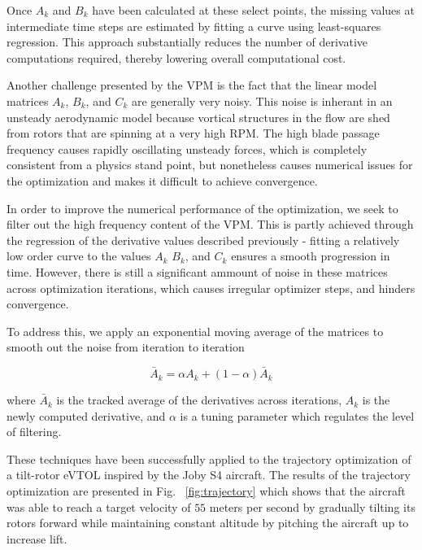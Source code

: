 \documentclass[12pt, letterpaper]{article}
\begin{document}
Once $A_k$ and $B_k$ have been calculated at these select points, the missing values at intermediate time steps are estimated by fitting a curve using least-squares regression.  This approach substantially reduces the number of derivative computations required, thereby lowering overall computational cost. 



Another challenge presented by the VPM is the fact that the linear model matrices $A_k$, $B_k$, and $C_k$ are generally very noisy.  This noise is inherant in an unsteady aerodynamic model because vortical structures in the flow are shed from rotors that are spinning at a very high RPM. The high blade passage frequency causes rapidly oscillating unsteady forces, which is completely consistent from a physics stand point, but nonetheless causes numerical issues for the optimization and makes it difficult to achieve convergence. 

In order to improve the numerical performance of the optimization, we seek to filter out the high frequency content of the VPM.  This is partly achieved through the regression of the derivative values described previously - fitting a relatively low order curve to the values $A_k$ $B_k$, and $C_k$ ensures a smooth progression in time.  However, there is still a significant ammount of noise in these matrices across optimization iterations, which causes irregular optimizer steps, and hinders convergence.

To address this, we apply an exponential moving average of the matrices to smooth out the noise from iteration to iteration

\begin{equation}
\label{eq:EMA}
    \bar{A}_k = \alpha A_k + (1 - \alpha) \bar{A}_k
\end{equation}

where $\bar{A}_k$ is the tracked average of the derivatives across iterations, $A_k$ is the newly computed derivative, and $\alpha$ is a tuning parameter which regulates the level of filtering.

These techniques have been successfully applied to the trajectory optimization of a tilt-rotor eVTOL inspired by the Joby S4 aircraft.  The results of the trajectory optimization are presented in Fig. ~\ref{fig:trajectory} which shows that the aircraft was able to reach a target velocity of $55$ meters per second by gradually tilting its rotors forward while maintaining constant altitude by pitching the aircraft up to increase lift.
\end{document}
